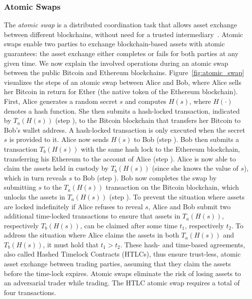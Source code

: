\subsubsection{Atomic Swaps}
The \emph{atomic swap} is a distributed coordination task that allows asset exchange between different blockchains, without need for a trusted intermediary~\cite{herlihy2018atomic}.
Atomic swaps enable two parties to exchange blockchain-based assets with atomic guarantees: the asset exchange either completes or fails for both parties at any given time.
We now explain the involved operations during an atomic swap between the public Bitcoin and Ethereum blockchains.
Figure~\ref{fig:atomic_swap} visualizes the steps of an atomic swap between Alice and Bob, where Alice sells her Bitcoin in return for Ether (the native token of the Ethereum blockchain).
First, Alice generates a random secret $ s $ and computes $ H(s) $, where $ H(\cdot) $ denotes a hash function.
She then submits a hash-locked transaction, indicated by $ T_a(H(s)) $ (step ), to the Bitcoin blockchain that transfers her Bitcoin to Bob's wallet address.
A hash-locked transaction is only executed when the secret $ s $ is provided to it.
Alice now sends $ H(s) $ to Bob (step ).
Bob then submits a transaction $ T_b(H(s)) $ with the same hash lock to the Ethereum blockchain, transferring his Ethereum to the account of Alice (step ).
Alice is now able to claim the assets held in custody by $ T_b(H(s)) $ (since she knows the value of $ s $), which in turn reveals $ s $ to Bob (step ).
Bob now completes the swap by submitting $ s $ to the $ T_a(H(s)) $ transaction on the Bitcoin blockchain, which unlocks the assets in $ T_a(H(s)) $ (step ).
To prevent the situation where assets are locked indefinitely if Alice refuses to reveal $ s $, Alice and Bob submit two additional time-locked transactions to ensure that assets in $ T_a(H(s)) $, respectively $ T_b(H(s)) $, can be claimed after some time $ t_1 $, respectively $ t_2 $.
To address the situation where Alice claims the assets in both $ T_a(H(s)) $ and $ T_b(H(s)) $, it must hold that $ t_1 > t_2 $.
These hash- and time-based agreements, also called Hashed Timelock Contracts (HTLCs), thus ensure trust-less, atomic asset exchange between trading parties, assuming that they claim the assets before the time-lock expires.
Atomic swaps eliminate the risk of losing assets to an adversarial trader while trading.
The HTLC atomic swap requires a total of four transactions.

